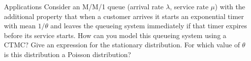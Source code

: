 \begin{problem}{Applications}
Consider an M/M/1 queue (arrival rate \( \lambda \), service rate \( \mu \)) with the additional property that when a customer arrives it starts an exponential timer with mean \( 1/\theta \) and leaves the queueing system immediately if that timer expires before its service starts. How can you model this queueing system using a CTMC? Give an expression for the stationary distribution. For which value of \( \theta \) is this distribution a Poisson distribution?
\end{problem}
